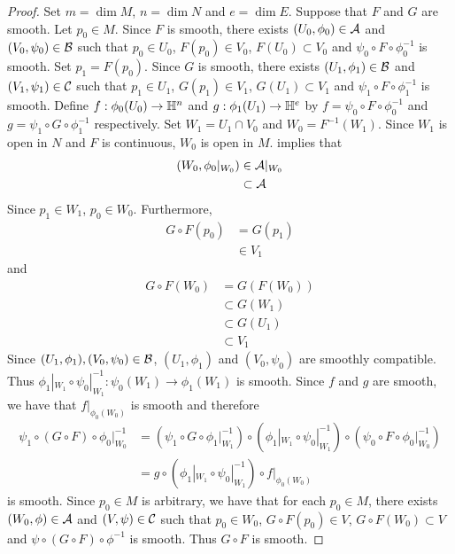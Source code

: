 \documentclass{book}
\begin{document}
\begin{proof}
	Set $m = \dim M$, $n = \dim N$ and $e = \dim E$. Suppose that $F$ and $G$ are smooth. Let $p_0 \in M$. Since $F$ is smooth, there exists $(U_0, \phi_0) \in \mathcal{A}$ and $(V_0, \psi_0) \in \mathcal{B}$ such that $p_0 \in U_0$, $F(p_0) \in V_0$, $F(U_0) \subset V_0$ and $\psi_0 \circ F \circ \phi_0^{-1}$ is smooth. Set $p_1 = F(p_0)$. Since $G$ is smooth, there exists $(U_1, \phi_1) \in \mathcal{B}$ and $(V_1, \psi_1) \in \mathcal{C}$ such that $p_1 \in U_1$, $G(p_1) \in V_1$, $G(U_1) \subset V_1$ and $\psi_1 \circ F \circ \phi_1^{-1}$ is smooth. Define $f:\phi_0(U_0) \rightarrow \mathbb{H}^n$ and $g: \phi_1(U_1) \rightarrow \mathbb{H}^e$ by $f = \psi_0 \circ F \circ \phi_0^{-1}$ and $g = \psi_1 \circ G \circ \phi_1^{-1}$ respectively. Set $W_1 = U_1 \cap V_0$ and $W_0 = F^{-1}(W_1)$. Since $W_1$ is open in $N$ and $F$ is continuous, $W_0$ is open in $M$.  implies that  
	\begin{align*}
		(W_0, \phi_0|_{W_0}) 
		& \in \mathcal{A}|_{W_0} \\
		& \subset \mathcal{A} 
	\end{align*}
	Since $p_1 \in W_1$, $p_0 \in W_0$. Furthermore, 
	\begin{align*}
		G \circ F (p_0)
		& = G(p_1) \\
		& \in V_1
	\end{align*}
	and 
	\begin{align*}
		G \circ F(W_0)
		& = G(F(W_0)) \\
		& \subset G(W_1) \\
		& \subset G(U_1) \\
		& \subset V_1
	\end{align*}
	Since $(U_1, \phi_1), (V_0, \psi_0) \in \mathcal{B}$, $(U_1, \phi_1)$ and $(V_0, \psi_0)$ are smoothly compatible. Thus $\phi_1|_{W_1} \circ \psi_0|_{W_1}^{-1}: \psi_0(W_1) \rightarrow \phi_1(W_1)$ is smooth. Since $f$ and $g$ are smooth, we have that $f|_{\phi_0(W_0)}$ is smooth and therefore
	\begin{align*}
		\psi_1 \circ (G \circ F) \circ \phi_0|_{W_0}^{-1}
		& = (\psi_1 \circ G \circ \phi_1|_{W_1}^{-1}) \circ (\phi_1|_{W_1}  \circ \psi_0|_{W_1}^{-1}) \circ  (\psi_0 \circ F \circ \phi_0|_{W_0}^{-1}) \\
		& = g \circ (\phi_1|_{W_1}  \circ \psi_0|_{W_1}^{-1}) \circ f|_{\phi_0(W_0)}
	\end{align*}
	is smooth. Since $p_0 \in M$ is arbitrary, we have that for each $p_0 \in M$, there exists $(W_0, \phi) \in \mathcal{A}$ and $(V, \psi) \in \mathcal{C}$ such that $p_0 \in W_0$, $G \circ F(p_0) \in V$, $G \circ F(W_0) \subset V$ and $\psi \circ (G \circ F) \circ \phi^{-1}$ is smooth. Thus $G \circ F$ is smooth.
\end{proof}
\end{document}
